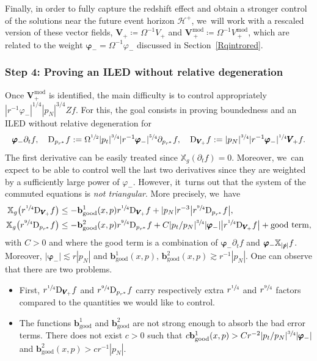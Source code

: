 \documentclass[JEP,XML,SOM,Unicode,published]{cedram}
\theoremstyle{plain}
\theoremstyle{definition}
\newcommand\T{{\mathbb{X}}}
\begin{document}
Finally, in order to fully capture the redshift effect and obtain a stronger control of the solutions near the future event horizon $\mathcal{H}^+$, we~will work with a rescaled version of these vector fields, $\pmb{V}_{\! +}\coloneqq\Omega^{-1}V_+$ and $\pmb{V}_{\, +}^{ \mathrm{mod}}\coloneqq \Omega^{-1}V_{\, +}^{ \mathrm{mod}}$, which are related to the weight $\pmb{\varphi}_-=\Omega^{-1} \varphi_-$ discussed in Section~\ref{Rqintrored}.

\subsubsection{Step 4: Proving an ILED without relative degeneration}

Once $\pmb{V}_+^{ \mathrm{mod}}$ is identified, the main difficulty is to control appropriately $|r^{-1}\varphi_-|^{1/4}|p_N|^{3/4} Z f $. For this, the goal consists in proving boundedness and an ILED without relative degeneration for
\[
\pmb{\varphi}_- \partial_t f, \quad \mathrm{D}_{p_{r^*}}f:= \Omega^{\sfrac{1}{2}}|p_t|^{\sfrac{3}{4}} |r^{-1} \pmb{\varphi}_-|^{\sfrac{5}{4}} \partial_{p_{r^*}} f, \quad \mathrm{D}_{\pmb{V}_{\! +}}f:=|p_N|^{\sfrac{3}{4}} |r^{-1} \pmb{\varphi}_-|^{\sfrac{1}{4}} \pmb{V}_{\! +} f.
\]
The first derivative can be easily treated since $\T_g(\partial_t f)=0$. Moreover, we~can expect to be able to control well the last two derivatives since they are weighted by a sufficiently large power of $\varphi_-$. However, it~turns out that the system of the commuted equations is \textit{not triangular}. More precisely, we~have
\begin{align*}
\T_g \bigl(r^{\sfrac{1}{4}} \mathrm{D}_{\pmb{V}_{\!+}} f \bigr) & \leq - \mathbf{b}_{\mathrm{good}}^1(x,p) r^{\sfrac{1}{4}}\mathrm{D}_{\pmb{V}_{\!+}} f + |p_N|r^{-3} \big|r^{\sfrac{9}{4}} \mathrm{D}_{p_{r^*}}f \big|, \\
\T_g \bigl(r^{\sfrac{9}{4}} \mathrm{D}_{p_{r^*}}f \bigr)& \leq -\mathbf{b}_{\mathrm{good}}^2(x,p) r^{\sfrac{9}{4}} \mathrm{D}_{p_{r^*}}f +C|p_t/p_N|^{\sfrac{3}{4}}|\pmb{\varphi}_-| \big|r^{\sfrac{1}{4}} \mathrm{D}_{\pmb{V}_{\!+}} f \big| +\textrm{good term},
\end{align*}
with $C>0$ and where the good term is a combination of $\pmb{\varphi}_- \partial_t f$ and $\pmb{\varphi}_- \T_{|\slashed{p}|}f$. Moreover, $|\pmb{\varphi}_-| \lesssim r|p_N|$ and $\mathbf{b}_{\mathrm{good}}^1(x,p), \,\mathbf{b}_{\mathrm{good}}^2(x,p) \gtrsim r^{-1}|p_N|$. One can observe that there are two problems.
\begin{itemize}
\item First, $r^{\sfrac{1}{4}} \mathrm{D}_{\pmb{V}_{\!+}} f$ and $r^{\sfrac{9}{4}} \mathrm{D}_{p_{r^*}}f$ carry respectively extra $r^{\sfrac{1}{4}}$ and $r^{\sfrac{9}{4}}$ factors compared to the quantities we would like to control.
\item The functions $\mathbf{b}_{\mathrm{good}}^1$ and $\mathbf{b}_{\mathrm{good}}^2$ are not strong enough to absorb the bad error terms. There does not exist $c>0$ such that $ c\mathbf{b}_{\mathrm{good}}^1(x,p) > Cr^{-2 }|p_t/p_N|^{\sfrac{3}{4}}|\pmb{\varphi}_-|$ and $ \mathbf{b}_{\mathrm{good}}^2(x,p) > c r^{-1} |p_N|$.
\end{itemize}
\end{document}
